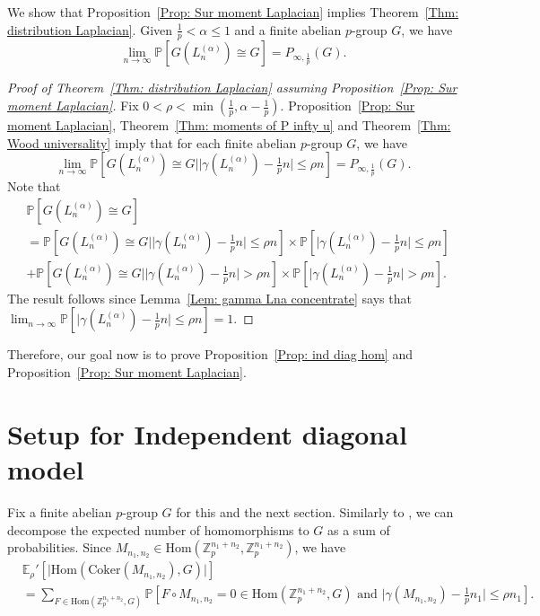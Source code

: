 \documentclass[12pt]{amsart}
\theoremstyle{definition}
\newcommand{\PPP}{\mathbb{P}}
\newcommand{\PPb}[1]{\PPP\left[#1\right]}
\newcommand{\Mnot}{M_{n_1,n_2}}
\newcommand{\Lna}{L_{n}^{(\alpha)}}
\newcommand{\Erhop}{\E_{\rho}'}
\newcommand{\abs}[1]{\vert#1\vert}
\newcommand{\Zpnot}{\Z_p^{n_1+n_2}}
\newcommand{\E}{\mathbb{E}}
\newcommand{\Z}{\mathbb{Z}}
\newcommand{\Coker}{\text{Coker}}
\newcommand{\Hom}{\text{Hom}}
\newenvironment{customthm}[1]
  {\renewcommand\theinnercustomthm{#1}\innercustomthm}
  {\endinnercustomthm}
\begin{document}
We show that Proposition~\ref{Prop: Sur moment Laplacian} implies Theorem~\ref{Thm: distribution Laplacian}.
\begin{customthm}{\ref{Thm: distribution Laplacian}}
Given $\frac{1}{p}<\alpha\leq 1$ and a finite abelian $p$-group $G$, we have
\[
\lim_{n\to\infty}
\PPP[G(\Lna)\cong G]
=P_{\infty,\frac{1}{p}}(G).
\]
\end{customthm}
\begin{proof}[Proof of Theorem~\ref{Thm: distribution Laplacian} assuming Proposition~\ref{Prop: Sur moment Laplacian}]
Fix $0<\rho<\min(\frac{1}{p},\alpha-\frac{1}{p})$.
Proposition~\ref{Prop: Sur moment Laplacian}, Theorem~\ref{Thm: moments of P infty u} and Theorem~\ref{Thm: Wood universality} imply that for each finite abelian $p$-group $G$, we have
\[
\lim_{n\to\infty} \PPP[ G(\Lna)\cong G \mid \abs{\gamma(\Lna)-\tfrac{1}{p} n} \leq \rho n]
=P_{\infty,\frac{1}{p}}(G).
\]
Note that
\begin{align*}
&\PPP[G(\Lna)\cong G]\\
&= \PPP[ G(\Lna)\cong G \mid \abs{\gamma(\Lna)-\tfrac{1}{p} n}\leq \rho n]
\times \PPP[\abs{\gamma(\Lna)-\tfrac{1}{p} n}\leq \rho n]\\
&+\PPP[ G(\Lna)\cong G \mid \abs{\gamma(\Lna)-\tfrac{1}{p} n}> \rho n]
\times \PPP[\abs{\gamma(\Lna)-\tfrac{1}{p} n}> \rho n].
\end{align*}
The result follows since Lemma~\ref{Lem: gamma Lna concentrate} says that $\lim_{n\to\infty} \PPP[\abs{\gamma(\Lna)-\tfrac{1}{p} n}\leq \rho n]=1$.
\end{proof}


Therefore, our goal now is to prove Proposition~\ref{Prop: ind diag hom} and Proposition~\ref{Prop: Sur moment Laplacian}.


\section{Setup for Independent diagonal model}\label{Sec: set ind diag dir}

Fix a finite abelian $p$-group $G$ for this and the next section.
Similarly to \cite{wood2017distribution}, we can decompose the expected number of homomorphisms to $G$ as a sum of probabilities.
Since $\Mnot\in \Hom(\Zpnot,\Zpnot)$, we have
\begin{align*}
&\Erhop[\abs{\Hom(\Coker(\Mnot),G)}]\\
&=\sum_{F\in\Hom(\Zpnot,G)} 
\PPb{F\circ \Mnot=0\in \Hom(\Zpnot,G) \text{ and } \abs{\gamma(\Mnot) -\tfrac{1}{p} n_1}\leq \rho n_1}.
\end{align*}
\end{document}
